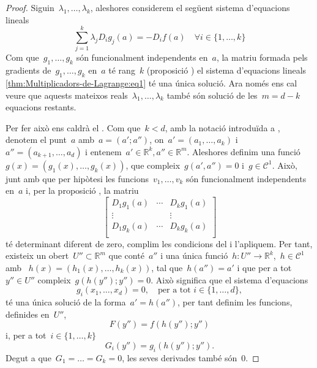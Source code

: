 \documentclass[../calcul-en-diverses-variables.tex]{subfiles}
\begin{document}
    \begin{proof}
        Siguin~\(\lambda_{1},\dots,\lambda_{k}\), aleshores considerem el següent sistema d'equacions lineals
        \begin{equation}\label{thm:Multiplicadors-de-Lagrange:eq1}
        \sum_{j=1}^{k}\lambda_{j}D_{i}g_{j}(a)=-D_{i}f(a)\quad\forall i\in\{1,\dots,k\}
        \end{equation}
        Com que~\(g_{1},\dots,g_{k}\) són funcionalment independents en~\(a\),
        la matriu formada pels gradients de~\(g_{1},\dots,g_{k}\) en~\(a\) té
        rang~\(k\) (proposició ) el sistema d'equacions lineals \eqref{thm:Multiplicadors-de-Lagrange:eq1} té una única solució.
        Ara només ens cal veure que aquests mateixos reals~\(\lambda_{1},\dots,\lambda_{k}\) també són solució de les~\(m=d-k\) equacions restants.

        Per fer això ens caldrà el .
        Com que~\(k<d\), amb la notació introduïda a , denotem el punt~\(a\) amb~\(a=(a';a'')\), on~\(a'=(a_{1},\dots,a_{k})\) i~\(a''=(a_{k+1},\dots,a_{d})\) i entenem~\(a'\in\mathbb{R}^{k},a''\in\mathbb{R}^{m}\).
        Aleshores definim una funció~\(g(x)=(g_{1}(x),\dots,g_{k}(x))\), que compleix~\(g(a',a'')=0\) i~\(g\in\mathcal{C}^{1}\).
        Això, junt amb que per hipòtesi les funcions~\(v_{1},\dots,v_{k}\) són funcionalment independents en~\(a\) i, per la proposició , la matriu
        \[\left[\begin{matrix}
        D_{1}g_{1}(a) & \cdots & D_{k}g_{1}(a)\\
        \vdots & & \vdots\\
        D_{1}g_{k}(a) & \cdots & D_{k}g_{k}(a)\\
        \end{matrix}\right]\]
        té determinant diferent de zero, complim les condicions del  i l'apliquem.
        Per tant, existeix un obert~\(U''\subset\mathbb{R}^{m}\) que conté~\(a''\) i una única funció~\(h\colon U''\to\mathbb{R}^{k}\),~\(h\in\mathcal{C}^{1}\) amb ~\(h(x)=(h_{1}(x),\dots,h_{k}(x))\), tal que~\(h(a'')=a'\) i que per a tot~\(y''\in U''\) compleix~\(g(h(y'');y'')=0\).
        Això significa que el sistema d'equacions
        \[
            g_{i}(x_{1},\dots,x_{d})=0,\quad\text{per a tot }i\in\{1,\dots,d\},
        \]
        té una única solució de la forma~\(a'=h(a'')\), per tant definim les funcions, definides en~\(U''\),
        \[
            F(y'')=f(h(y'');y'')
        \]
        i, per a tot~\(i\in\{1,\dots,k\}\)
        \[
            G_{i}(y'')=g_{i}(h(y'');y'').
        \]
        Degut a que~\(G_{1}=\dots=G_{k}=0\), les seves derivades també són~\(0\).
    \end{proof}
\end{document}
